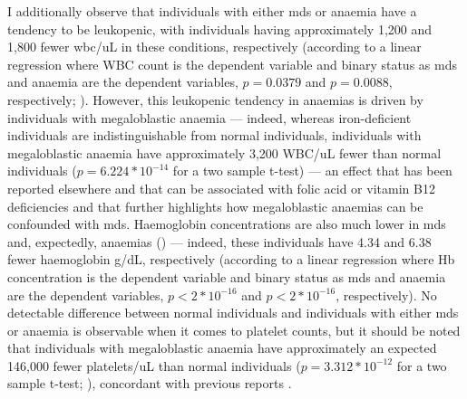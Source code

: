 \begin{figure}[!ht]
    \label{fig:mds-age}
\end{figure}

\begin{figure}[!ht]
    \label{fig:mds-sex}
\end{figure}

I additionally observe that individuals with either \ac{mds} or anaemia have a tendency to be leukopenic, with individuals having approximately 1,200 and 1,800 fewer \ac{wbc}/uL in these conditions, respectively (according to a linear regression where WBC count is the dependent variable and binary status as \ac{mds} and anaemia are the dependent variables, $p=0.0379$ and $p=0.0088$, respectively; ). However, this leukopenic tendency in anaemias is driven by individuals with megaloblastic anaemia --- indeed, whereas iron-deficient individuals are indistinguishable from normal individuals, individuals with megaloblastic anaemia have approximately 3,200 WBC/uL fewer than normal individuals ($p=6.224*10^{-14}$ for a two sample t-test) --- an effect that has been reported elsewhere and that can be associated with folic acid or vitamin B12 deficiencies \cite{Kaferle2009-pl,Castle1978-ky} and that further highlights how megaloblastic anaemias can be confounded with \ac{mds}. Haemoglobin concentrations are also much lower in \ac{mds} and, expectedly, anaemias () --- indeed, these individuals have 4.34 and 6.38 fewer haemoglobin g/dL, respectively (according to a linear regression where Hb concentration is the dependent variable and binary status as \ac{mds} and anaemia are the dependent variables, $p<2*10^{-16}$ and $p<2*10^{-16}$, respectively). No detectable difference between normal individuals and individuals with either \ac{mds} or anaemia is observable when it comes to platelet counts, but it should be noted that individuals with megaloblastic anaemia have approximately an expected 146,000 fewer platelets/uL than normal individuals ($p=3.312*10^{-12}$ for a two sample t-test; ), concordant with previous reports \cite{Castle1978-ky}. 

\begin{figure}[!ht]
    \label{fig:mds-wbcc}
\end{figure}


